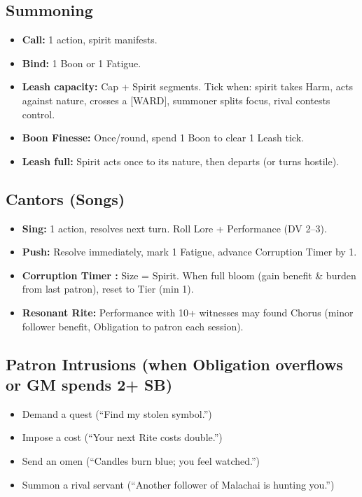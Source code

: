\subsection*{Summoning}
\begin{itemize}
  \item \textbf{Call:} 1 action, spirit manifests.
  \item \textbf{Bind:} 1 Boon or 1 Fatigue.
  \item \textbf{Leash capacity:} Cap + Spirit segments. Tick when: spirit takes Harm, acts against nature, crosses a [WARD], summoner splits focus, rival contests control.
  \item \textbf{Boon Finesse:} Once/round, spend 1 Boon to clear 1 Leash tick.
  \item \textbf{Leash full:} Spirit acts once to its nature, then departs (or turns hostile).
\end{itemize}

\subsection*{Cantors (Songs)}
\begin{itemize}
  \item \textbf{Sing:} 1 action, resolves next turn. Roll Lore + Performance (DV 2--3).
  \item \textbf{Push:} Resolve immediately, mark 1 Fatigue, advance Corruption Timer by 1.
  \item \textbf{Corruption Timer :} Size = Spirit. When full \rightarrow bloom (gain benefit \& burden from last patron), reset to Tier (min 1).
  \item \textbf{Resonant Rite:} Performance with 10+ witnesses \rightarrow may found Chorus (minor follower benefit, Obligation to patron each session).
\end{itemize}

\subsection*{Patron Intrusions (when Obligation overflows or GM spends 2+ SB)}
\begin{itemize}
  \item Demand a quest (``Find my stolen symbol.'')
  \item Impose a cost (``Your next Rite costs double.'')
  \item Send an omen (``Candles burn blue; you feel watched.'')
  \item Summon a rival servant (``Another follower of Malachai is hunting you.'')
\end{itemize}

